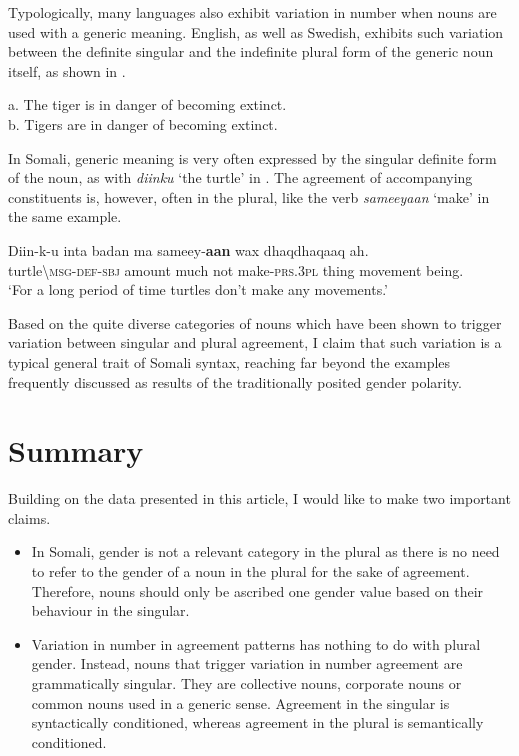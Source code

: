 \documentclass[output=paper]{langsci/langscibook}
\begin{document}
Typologically, many languages also exhibit variation in number when nouns are used with a generic meaning. English, as well as Swedish, exhibits such variation between the definite singular and the indefinite plural form of the generic noun itself, as shown in .

\ea
 a.  The tiger is in danger of becoming extinct.\\
 b.  Tigers are in danger of becoming extinct.\\
\z

In Somali, generic meaning is very often expressed by the singular definite form of the noun, as with \textit{diinku} ‘the turtle’ in . The agreement of accompanying constituents is, however, often in the plural, like the verb \textit{sameeyaan} ‘make’ in the same example.

\ea
\gll Diin-k-u    inta  badan  ma  sameey-\textbf{aan}  wax  dhaqdhaqaaq  ah.\\
     turtle{\textbackslash}\textsc{msg-def-sbj}  amount  much  not  make-\textsc{prs.3pl}  thing  movement  being.\\
\glt ‘For a long period of time turtles don’t make any movements.’
\z

Based on the quite diverse categories of nouns which have been shown to trigger variation between singular and plural agreement, I claim that such variation is a typical general trait of Somali syntax, reaching far beyond the examples frequently discussed as results of the traditionally posited gender polarity.  

\section{Summary}

Building on the data presented in this article, I would like to make two important claims. 


\begin{itemize}
\item In Somali, gender is not a relevant category in the plural as there is no need to refer to the gender of a noun in the plural for the sake of agreement. Therefore, nouns should only be ascribed one gender value based on their behaviour in the singular. 

\item Variation in number in agreement patterns has nothing to do with plural gender. Instead, nouns that trigger variation in number agreement are grammatically singular. They are collective nouns, corporate nouns or common nouns used in a generic sense. Agreement in the singular is syntactically conditioned, whereas agreement in the plural is semantically conditioned.

\end{itemize}
\end{document}
